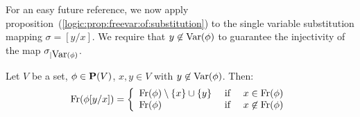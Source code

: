For an easy future reference, we now apply
proposition~(\ref{logic:prop:freevar:of:substitution}) to the single
variable substitution mapping $\sigma=[y/x]$. We require that
$y\not\in\mbox{\rm Var}(\phi)$ to guarantee the injectivity of the map
$\sigma_{|\mbox{\rm Var}(\phi)}$.
\begin{prop}\label{logic:prop:freevar:single:subst}
    Let $V$ be a set, $\phi\in\mbox{${\bf P}(V)$}$, $x,y\in V$ with $y\not\in\mbox{\rm Var}(\phi)$. Then:
    \[
        \mbox{\rm Fr}(\phi[y/x])=
            \left\{\begin{array}{lcl}
                \mbox{\rm Fr}(\phi)\setminus\{x\}\cup\{y\}
                    &\mbox{\ if\ }&
                x\in\mbox{\rm Fr}(\phi)
                \\
                \mbox{\rm Fr}(\phi)
                    &\mbox{\ if\ }&
                x\not\in\mbox{\rm Fr}(\phi)
            \end{array}\right.
    \]
\end{prop}
